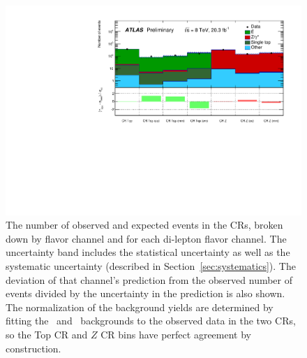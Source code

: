 \begin{figure}[ht]
\centering
\includegraphics[width=\textwidth]{figs/blstop/histpull_CR_detailed.pdf}
\caption{The number of observed and expected events in the CRs,
  broken down by flavor channel and for each di-lepton flavor channel.
  The uncertainty band includes the statistical uncertainty as well as the
  systematic uncertainty (described in Section~\ref{sec:systematics}).
  The deviation of that channel's prediction from the observed number of events
  divided by the uncertainty in the prediction is also shown.
  The normalization of the background yields are determined
  by fitting the \TTBAR\ and \ZGAMMAJETS\ backgrounds to the observed
  data in the two CRs, so the Top CR and $Z$ CR bins have perfect agreement by
  construction.
}
\label{fig:pull_dist_cr}
\end{figure}

